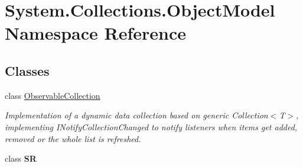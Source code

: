 \hypertarget{namespace_system_1_1_collections_1_1_object_model}{}\section{System.\+Collections.\+Object\+Model Namespace Reference}
\label{namespace_system_1_1_collections_1_1_object_model}
\subsection*{Classes}
\begin{DoxyCompactItemize}
\item 
class \hyperlink{class_system_1_1_collections_1_1_object_model_1_1_observable_collection}{Observable\+Collection}
\begin{DoxyCompactList}\small\item\em Implementation of a dynamic data collection based on generic Collection$<$T$>$, implementing I\+Notify\+Collection\+Changed to notify listeners when items get added, removed or the whole list is refreshed. \end{DoxyCompactList}\item 
class {\bfseries SR}
\end{DoxyCompactItemize}
